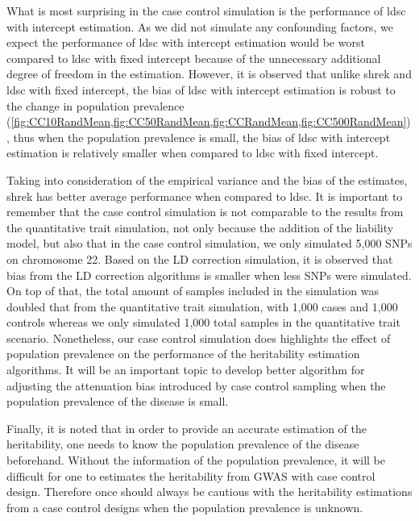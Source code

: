 \documentclass[12pt]{scrbook}
\begin{document}
What is most surprising in the case control simulation is the performance of \gls{ldsc} with intercept estimation.
As we did not simulate any confounding factors, we expect the performance of \gls{ldsc} with intercept estimation would be worst compared to \gls{ldsc} with fixed intercept because of the unnecessary additional degree of freedom in the estimation. 
However, it is observed that unlike \gls{shrek} and \gls{ldsc} with fixed intercept, the bias of \gls{ldsc} with intercept estimation is robust to the change in population prevalence (\cref{fig:CC10RandMean,fig:CC50RandMean,fig:CCRandMean,fig:CC500RandMean}), thus when the population prevalence is small, the bias of \gls{ldsc} with intercept estimation is relatively smaller when compared to \gls{ldsc} with fixed intercept.

Taking into consideration of the empirical variance and the bias of the estimates, \gls{shrek} has better average performance when compared to \gls{ldsc}. 
It is important to remember that the case control simulation is not comparable to the results from the quantitative trait simulation, not only because the addition of the liability model, but also that in the case control simulation, we only simulated 5,000 \glspl{SNP} on chromosome 22.
Based on the \gls{LD} correction simulation, it is observed that bias from the \gls{LD} correction algorithms is smaller when less \glspl{SNP} were simulated. 
On top of that, the total amount of samples included in the simulation was doubled that from the quantitative trait simulation, with 1,000 cases and 1,000 controls whereas we only simulated 1,000 total samples in the quantitative trait scenario. 
Nonetheless, our case control simulation does highlights the effect of population prevalence on the performance of the heritability estimation algorithms.
It will be an important topic to develop better algorithm for adjusting the attenuation bias introduced by case control sampling when the population prevalence of the disease is small.

Finally, it is noted that in order to provide an accurate estimation of the heritability, one needs to know the population prevalence of the disease beforehand. 
Without the information of the population prevalence, it will be difficult for one to estimates the heritability from \gls{GWAS} with case control design. 
Therefore once should always be cautious with the heritability estimations from a case control designs when the population prevalence is unknown.
\end{document}
